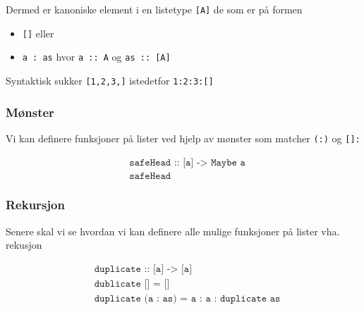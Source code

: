 \documentclass{article}
\begin{document}
Dermed er kanoniske element i en listetype \texttt{[A]} de som er på formen

\begin{itemize}
    \item \texttt{[]} eller
    \item \texttt{a : as} hvor \texttt{a :: A} og \texttt{as :: [A]}
\end{itemize}

Syntaktisk sukker \texttt{[1,2,3,]} istedetfor \texttt{1:2:3:[]}

\subsubsection{Mønster}

Vi kan definere funksjoner på lister ved hjelp av mønster som matcher \texttt{(:)} og \texttt{[]:}

\begin{align*}
    &\texttt{safeHead :: [a] -> Maybe a} \\
    &\texttt{safeHead}
\end{align*}

\subsubsection{Rekursjon}

Senere skal vi se hvordan vi kan definere alle mulige funksjoner på lister vha. rekusjon

\begin{align*}
    &\texttt{duplicate :: [a] -> [a]} \\
    &\texttt{dublicate [] = []} \\
    &\texttt{duplicate (a : as) = a : a : duplicate as}
\end{align*}
\end{document}
